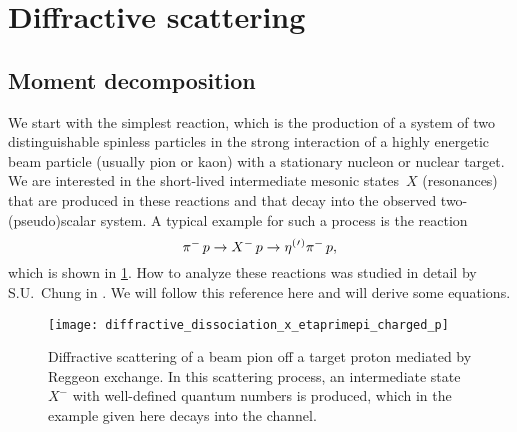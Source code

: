 \section{Diffractive scattering}%
\label{sec:diffraction}

\subsection{Moment decomposition}%
\label{sec:diffraction:moment}

We start with the simplest reaction, which is the production of a
system of two distinguishable spinless particles in the strong
interaction of a highly energetic beam particle (usually pion or kaon)
with a stationary nucleon or nuclear target.  We are interested in the
short-lived intermediate mesonic states~$X$ (resonances) that are
produced in these reactions and that decay into the observed
two-(pseudo)scalar system.  A typical example for such a process is
the reaction
\begin{equation}
  \pi^-\, p \to X^-\, p \to \etaOrPrPim\, p,
\end{equation}
which is shown in \cref{fig:diffraction_etaprimepi}.  How to analyze
these reactions was studied in detail by S.U.~Chung in
.  We will follow this reference here and will
derive some equations.

\begin{figure}[bp]
  \centering%
  \texttt{[image: diffractive\_dissociation\_x\_etaprimepi\_charged\_p]}%
  \caption{Diffractive scattering of a beam pion off a target proton
  mediated by Reggeon exchange.  In this scattering process, an
  intermediate state~$X^-$ with well-defined quantum numbers is
  produced, which in the example given here decays into the
  \etaOrPrPim channel.}%
  \label{fig:diffraction_etaprimepi}%
\end{figure}

